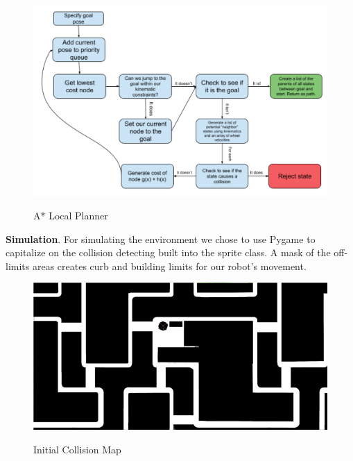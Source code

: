 \documentclass{article}
\begin{document}
\begin{multicols}{2}
\begin{figure}[H]
    \includegraphics[width = 1\columnwidth]{figures/astar.png}
     \label{fig:astar}
     \caption{A* Local Planner}
\end{figure}
\noindent \textbf{Simulation}. For simulating the environment we chose to use Pygame to capitalize on the collision detecting built into the sprite class.  A mask of the off-limits areas creates curb and building limits for our robot's movement.
\begin{figure}[H]
   \centering
    \includegraphics[width = 1\columnwidth]{figures/mask.png}
     \label{fig:mask}
     \caption{Initial Collision Map}
\end{figure}


\end{multicols}
\end{document}
